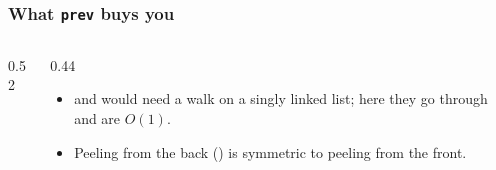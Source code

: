 \documentclass[aspectratio=169,10pt,compress]{beamer}
\begin{document}




\begin{frame}[t,fragile] \frametitle{What \texttt{prev} buys you}
  \begin{columns}[T]
    \begin{column}{0.52\textwidth}
    \end{column}
    \begin{column}{0.44\textwidth}
      \small
      \begin{itemize}
        \item {} and  would need a
              walk on a singly linked list; here they go through
               and are $O(1)$.
        \item Peeling from the back () is
              symmetric to peeling from the front.
      \end{itemize}
    \end{column}
  \end{columns}
\end{frame}

\end{document}
